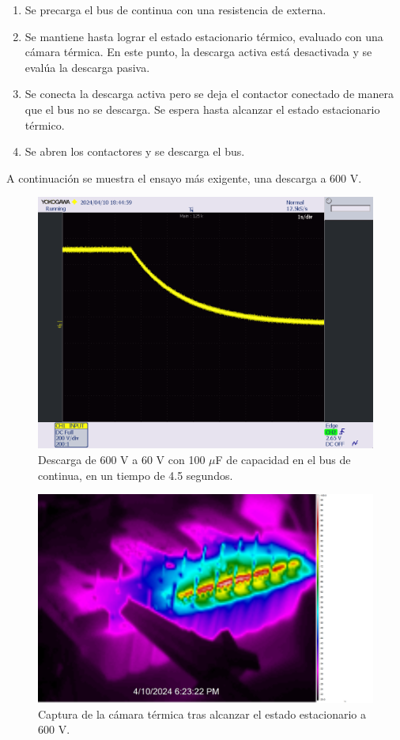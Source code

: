 \begin{enumerate}
	\item Se precarga el bus de continua con una resistencia de externa.
	\item Se mantiene hasta lograr el estado estacionario térmico, evaluado con una cámara térmica. En este punto, la descarga activa está desactivada y se evalúa la descarga pasiva.
	\item Se conecta la descarga activa pero se deja el contactor conectado de manera que el bus no se descarga. Se espera hasta alcanzar el estado estacionario térmico.
	\item Se abren los contactores y se descarga el bus.
\end{enumerate}

A continuación se muestra el ensayo más exigente, una descarga a 600 V.

\begin{figure}[H]
	\centering
	\includegraphics[width=0.7\linewidth]{fig/dischargeGuapo}
	\caption{Descarga de 600 V a 60 V con 100 $\mu$F de capacidad en el bus de continua, en un tiempo de 4.5 segundos.}
\end{figure}

\begin{figure}[H]
	\centering
	\includegraphics[width=0.7\linewidth]{fig/dischargeGuapisimo}
	\caption{Captura de la cámara térmica tras alcanzar el estado estacionario a 600 V.}
\end{figure}



